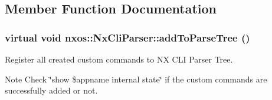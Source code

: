 \subsection{Member Function Documentation}
\hypertarget{classnxos_1_1NxCliParser_a3c5295a4b2de3068d1653a6c303a22ee}{
\subsubsection[{addToParseTree}]{\setlength{\rightskip}{0pt plus 5cm}virtual void nxos::NxCliParser::addToParseTree ()}}
\label{classnxos_1_1NxCliParser_a3c5295a4b2de3068d1653a6c303a22ee}
Register all created custom commands to NX CLI Parser Tree. \begin{DoxyNote}{Note}
Check \char`\"{}show \$appname internal state\char`\"{} if the custom commands are successfully added or not. 
\end{DoxyNote}

